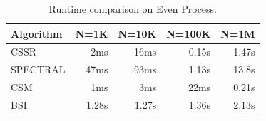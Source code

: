 \begin{table}[htbp]
\centering
\begin{tabular}{lrrrr}
\toprule
\textbf{Algorithm} & \textbf{N=1K} & \textbf{N=10K} & \textbf{N=100K} & \textbf{N=1M} \\
\midrule
CSSR & 2ms & 16ms & 0.15s & 1.47s \\
SPECTRAL & 47ms & 93ms & 1.13s & 13.8s \\
CSM & 1ms & 3ms & 22ms & 0.21s \\
BSI & 1.28s & 1.27s & 1.36s & 2.13s \\
\bottomrule
\end{tabular}
\caption{Runtime comparison on Even Process.}
\label{tab:runtime}
\end{table}
